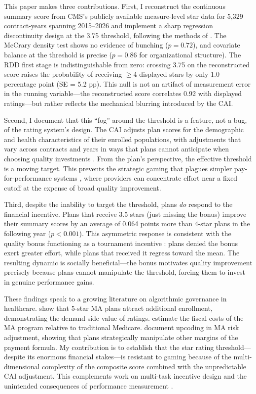 \documentclass[12pt]{article}
\begin{document}
This paper makes three contributions. First, I reconstruct the continuous summary score from CMS's publicly available measure-level star data for 5,329 contract-years spanning 2015--2026 and implement a sharp regression discontinuity design at the 3.75 threshold, following the methods of \citet{cattaneo2020}. The McCrary density test \citep{mccrary2008} shows no evidence of bunching ($p = 0.72$), and covariate balance at the threshold is precise ($p = 0.86$ for organizational structure). The RDD first stage is indistinguishable from zero: crossing 3.75 on the reconstructed score raises the probability of receiving $\geq$4 displayed stars by only 1.0 percentage point (SE = 5.2 pp). This null is not an artifact of measurement error in the running variable---the reconstructed score correlates 0.92 with displayed ratings---but rather reflects the mechanical blurring introduced by the CAI.

Second, I document that this ``fog'' around the threshold is a feature, not a bug, of the rating system's design. The CAI adjusts plan scores for the demographic and health characteristics of their enrolled populations, with adjustments that vary across contracts and years in ways that plans cannot anticipate when choosing quality investments \citep{reid2013}. From the plan's perspective, the effective threshold is a moving target. This prevents the strategic gaming that plagues simpler pay-for-performance systems \citep{mullen2010, dranove2003}, where providers can concentrate effort near a fixed cutoff at the expense of broad quality improvement.

Third, despite the inability to target the threshold, plans \emph{do} respond to the financial incentive. Plans that receive 3.5 stars (just missing the bonus) improve their summary scores by an average of 0.064 points more than 4-star plans in the following year ($p < 0.001$). This asymmetric response is consistent with the quality bonus functioning as a tournament incentive \citep{lazear1981}: plans denied the bonus exert greater effort, while plans that received it regress toward the mean. The resulting dynamic is socially beneficial---the bonus motivates quality improvement precisely because plans cannot manipulate the threshold, forcing them to invest in genuine performance gains.

These findings speak to a growing literature on algorithmic governance in healthcare. \citet{darden2015} show that 5-star MA plans attract additional enrollment, demonstrating the demand-side value of ratings. \citet{curto2021} estimate the fiscal costs of the MA program relative to traditional Medicare. \citet{geruso2020} document upcoding in MA risk adjustment, showing that plans strategically manipulate other margins of the payment formula. My contribution is to establish that the star rating threshold---despite its enormous financial stakes---is resistant to gaming because of the multi-dimensional complexity of the composite score combined with the unpredictable CAI adjustment. This complements work on multi-task incentive design \citep{holmstrom1991} and the unintended consequences of performance measurement \citep{baker1992}.
\end{document}
